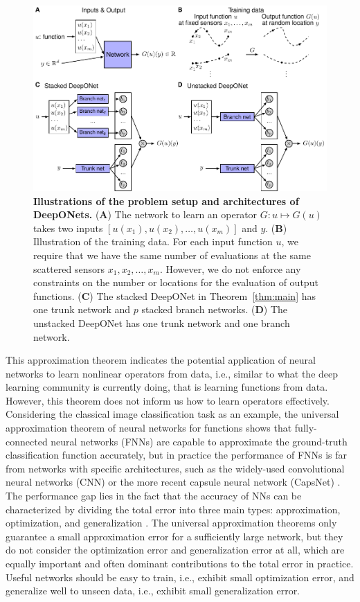 \documentclass[11pt]{article}
\begin{document}
\begin{figure}[htbp]
\centering
\includegraphics{deeponet.pdf}
\caption{\textbf{Illustrations of the problem setup and architectures of DeepONets.} (\textbf{A}) The network to learn an operator $G: u \mapsto G(u)$ takes two inputs $[u(x_1), u(x_2), \dots, u(x_m)]$ and $y$. (\textbf{B}) Illustration of the training data. For each input function $u$, we require that we have the same number of evaluations at the same scattered sensors $x_1, x_2, \dots, x_m$. However, we do not enforce any constraints on the number or locations for the evaluation of output functions. (\textbf{C}) The stacked DeepONet in Theorem~\ref{thm:main} has one trunk network and $p$ stacked branch networks. (\textbf{D}) The unstacked DeepONet has one trunk network and one branch network.}
\label{fig:problem}
\end{figure}

This approximation theorem indicates the potential application of neural networks to learn nonlinear operators from data, i.e., similar to what the deep learning community is currently doing, that is learning functions from data. However, this theorem does not inform us how to learn operators effectively. Considering the classical image classification task as an example, the universal approximation theorem of neural networks for functions \cite{cybenko1989approximation,hornik1989multilayer} shows that fully-connected neural networks (FNNs) are capable to approximate the ground-truth classification function accurately, but in practice the performance of FNNs is far  from networks with specific architectures, such as the widely-used convolutional neural networks (CNN) \cite{krizhevsky2012imagenet} or the more recent capsule neural network (CapsNet) \cite{sabour2017dynamic}. The performance gap lies in the fact that the accuracy of NNs can be characterized by dividing the total error into three main types: approximation, optimization, and generalization \cite{bottou2008tradeoffs,lu2018collapse,jin2019quantifying,lu2019dying}. The universal approximation theorems only guarantee a small approximation error for a sufficiently large network, but they do not consider the optimization error and generalization error at all, which are equally important and often dominant contributions to the total error in practice. Useful networks should be easy to train, i.e., exhibit small optimization error, and generalize well to unseen data, i.e., exhibit small generalization error. 
\end{document}
